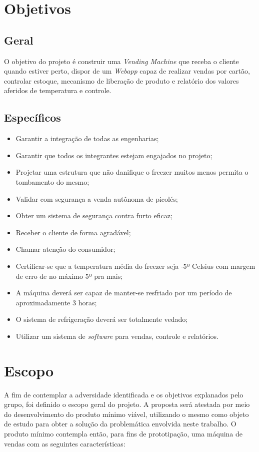 \section{Objetivos}

\subsection{Geral}

O objetivo do projeto é construir uma \textit{Vending Machine} que receba o cliente quando estiver perto, dispor de um \textit{Webapp} capaz de realizar vendas por cartão, controlar estoque, mecanismo de liberação de produto e relatório dos valores aferidos de temperatura e controle.

\subsection{Específicos}

\begin{itemize}
\item Garantir a integração de todas as engenharias;
\item Garantir que todos os integrantes estejam engajados no projeto;
\item Projetar uma estrutura que não danifique o freezer muitos menos permita o tombamento do mesmo;
\item Validar com segurança a venda autônoma de picolés;
\item Obter um sistema de segurança contra furto eficaz;
\item Receber o cliente de forma agradável;
\item Chamar atenção do consumidor;
\item Certificar-se que a temperatura média do freezer seja -5º Celsius com margem de erro de no máximo 5º pra mais;
\item A máquina deverá ser capaz de manter-se resfriado por um período de aproximadamente 3 horas;
\item O sistema de refrigeração deverá ser totalmente vedado;
\item Utilizar um sistema de \textit{software} para vendas, controle e relatórios.
\end{itemize}


\section{Escopo}
A fim de contemplar a adversidade identificada e os objetivos explanados pelo grupo, foi definido o escopo geral do projeto. A proposta será atestada por meio do desenvolvimento do produto mínimo viável, utilizando o mesmo como objeto de estudo para obter a solução da problemática envolvida neste trabalho. O produto mínimo contempla então, para fins de prototipação, uma máquina de vendas com as seguintes características:

